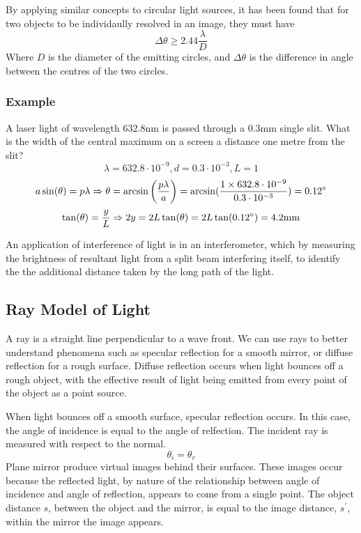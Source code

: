\documentclass[12pt]{report}
\begin{document}
\begin{flushleft}
\bigskip
By applying similar concepts to circular light sources, it has been found that
for two objects to be individaully resolved in an image, they must have 
\[\Delta\theta \geq 2.44\frac{\lambda}{D}\]
Where \(D\) is the diameter of the emitting circles, and \(\Delta\theta\) is 
the difference in angle between the centres of the two circles.

\subsubsection*{Example}
A laser light of wavelength \(632.8\mathrm{nm}\) is passed through a 
\(0.3\mathrm{mm}\) single slit. What is the width of the central maximum on a
screen a distance one metre from the slit?
\[\lambda = 632.8\cdot10^{-9}, d = 0.3\cdot10^{-3}, L = 1\]
\[a\sin(\theta) = p\lambda \Rightarrow \theta = 
\arcsin\left(\frac{p\lambda}{a}\right) = 
\arcsin(\frac{1\times632.8\cdot10^{-9}}{0.3\cdot10^{-3}}) = 0.12\degree\]
\[\tan(\theta) = \frac{y}{L} \Rightarrow 2y = 2L\tan(\theta) 
= 2L\tan(0.12\degree) = 4.2\mathrm{mm}\]

An application of interference of light is in an interferometer, which by
measuring the brightness of resultant light from a split beam interfering
itself, to identify the the additional distance taken by the long path of
the light.

\subsection*{Ray Model of Light}
A ray is a straight line perpendicular to a wave front. We can use rays to
better understand phenomena such as specular reflection for a smooth mirror,
or diffuse reflection for a rough surface. Diffuse reflection occurs when light
bounces off a rough object, with the effective result of light being emitted
from every point of the object as a point source.

\bigskip
When light bounces off a smooth surface, specular reflection occurs. In this
case, the angle of incidence is equal to the angle of relfection. The incident
ray is measured with respect to the normal.
\[\theta_i = \theta_r\]
Plane mirror produce virtual images behind their surfaces. These images occur
because the reflected light, by nature of the relationship between angle of
incidence and angle of reflection, appears to come from a single point. The
object distance \(s\), between the object and the mirror, is equal to the
image distance, \(s^\prime\), within the mirror the image appears.


\end{flushleft}
\end{document}
